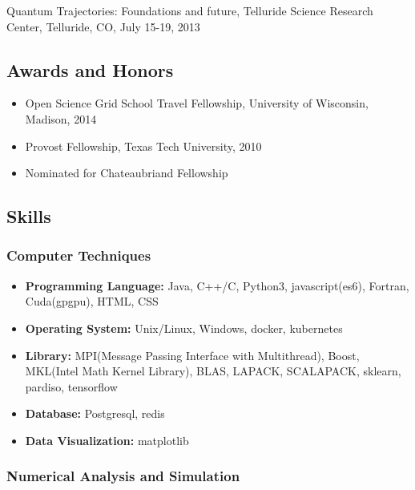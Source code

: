 \documentclass[
]{article}
\providecommand{\tightlist}{%
  \setlength{\itemsep}{0pt}\setlength{\parskip}{0pt}}
\begin{document}
Quantum Trajectories: Foundations and future, Telluride Science Research
Center, Telluride, CO, July 15-19, 2013

\hypertarget{awards-and-honors}{%
\subsection{Awards and Honors}\label{awards-and-honors}}

\begin{itemize}
\tightlist
\item
  Open Science Grid School Travel Fellowship, University of Wisconsin,
  Madison, 2014
\item
  Provost Fellowship, Texas Tech University, 2010
\item
  Nominated for Chateaubriand Fellowship
\end{itemize}

\hypertarget{skills}{%
\subsection{Skills}\label{skills}}

\hypertarget{computer-techniques}{%
\subsubsection{Computer Techniques}\label{computer-techniques}}

\begin{itemize}
\tightlist
\item
  \textbf{Programming Language:} Java, C++/C, Python3, javascript(es6),
  Fortran, Cuda(gpgpu), HTML, CSS
\item
  \textbf{Operating System:} Unix/Linux, Windows, docker, kubernetes
\item
  \textbf{Library:} MPI(Message Passing Interface with Multithread),
  Boost, MKL(Intel Math Kernel Library), BLAS, LAPACK, SCALAPACK,
  sklearn, pardiso, tensorflow
\item
  \textbf{Database:} Postgresql, redis
\item
  \textbf{Data Visualization:} matplotlib
\end{itemize}

\hypertarget{numerical-analysis-and-simulation}{%
\subsubsection{Numerical Analysis and
Simulation}\label{numerical-analysis-and-simulation}}
\end{document}
